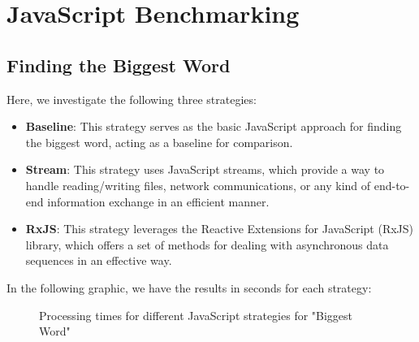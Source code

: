 \section{JavaScript Benchmarking}
\label{sec:js_implementation}


\subsection{Finding the Biggest Word}
\label{subsec:biggest_word_js}

Here, we investigate the following three strategies:

\begin{itemize}
    \item \textbf{Baseline}: This strategy serves as the basic JavaScript approach for finding the biggest word, acting as a baseline for comparison.
    \item \textbf{Stream}: This strategy uses JavaScript streams, which provide a way to handle reading/writing files, network communications, or any kind of end-to-end information exchange in an efficient manner.
    \item \textbf{RxJS}: This strategy leverages the Reactive Extensions for JavaScript (RxJS) library, which offers a set of methods for dealing with asynchronous data sequences in an effective way.
\end{itemize}


In the following graphic, we have the results in seconds for each strategy:


\begin{figure}[H]
    \centering
    \caption{Processing times for different JavaScript strategies for "Biggest Word"}
    \label{fig:biggest_word_processing_times_js}
\end{figure}


